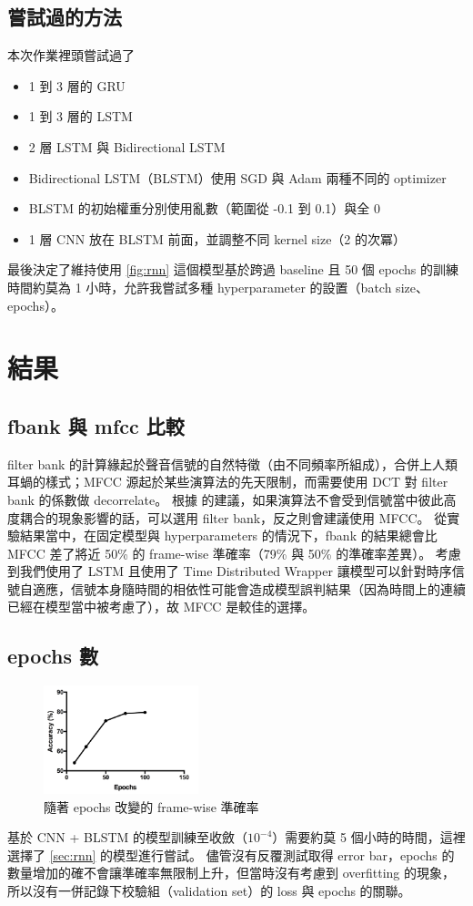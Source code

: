 \documentclass[final,3p]{elsarticle}
\begin{document}
	\subsection{嘗試過的方法}
		本次作業裡頭嘗試過了
		\begin{itemize}
			\item 1 到 3 層的 GRU
			\item 1 到 3 層的 LSTM
			\item 2 層 LSTM 與 Bidirectional LSTM
			\item Bidirectional LSTM（BLSTM）使用 SGD 與 Adam 兩種不同的 optimizer
			\item BLSTM 的初始權重分別使用亂數（範圍從 -0.1 到 0.1）與全 0
			\item 1 層 CNN 放在 BLSTM 前面，並調整不同 kernel size（2 的次冪）
		\end{itemize}	
		
		最後決定了維持使用 \cref{fig:rnn} 這個模型基於跨過 baseline 且 50 個 epochs 的訓練時間約莫為 1 小時，允許我嘗試多種 hyperparameter 的設置（batch size、epochs）。
		
\section{結果}
	\subsection{fbank 與 mfcc 比較}
		filter bank 的計算緣起於聲音信號的自然特徵（由不同頻率所組成），合併上人類耳蝸的樣式；MFCC 源起於某些演算法的先天限制，而需要使用 DCT 對 filter bank 的係數做 decorrelate。
		根據 \cite{SpeechPr91:online} 的建議，如果演算法不會受到信號當中彼此高度耦合的現象影響的話，可以選用 filter bank，反之則會建議使用 MFCC。
		從實驗結果當中，在固定模型與 hyperparameters 的情況下，fbank 的結果總會比 MFCC 差了將近 50\% 的 frame-wise 準確率（79\% 與 50\% 的準確率差異）。
		考慮到我們使用了 LSTM 且使用了 Time Distributed Wrapper 讓模型可以針對時序信號自適應，信號本身隨時間的相依性可能會造成模型誤判結果（因為時間上的連續已經在模型當中被考慮了），故 MFCC 是較佳的選擇。
		
	\subsection{epochs 數}
		\begin{figure}[H]
			\centering
			\includegraphics[width=0.4\textwidth]{images/epochs_accuracy}
			\caption{隨著 epochs 改變的 frame-wise 準確率} \label{fig:epo_acc}
		\end{figure}
		基於 CNN + BLSTM 的模型訓練至收斂（$10^{-4}$）需要約莫 5 個小時的時間，這裡選擇了 \cref{sec:rnn} 的模型進行嘗試。
		儘管沒有反覆測試取得 error bar，epochs 的數量增加的確不會讓準確率無限制上升，但當時沒有考慮到 overfitting 的現象，所以沒有一併記錄下校驗組（validation set）的 loss 與 epochs 的關聯。
		
\end{document}
